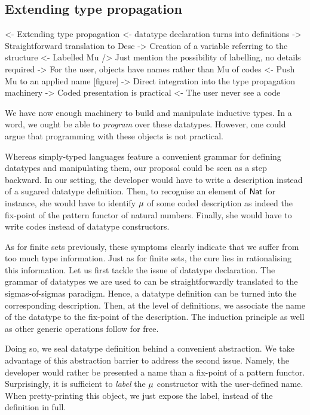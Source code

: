 \subsection{Extending type propagation}

\begin{wstructure}
<- Extending type propagation
    <- datatype declaration turns into definitions
        -> Straightforward translation to Desc
        -> Creation of a variable referring to the structure
    <- Labelled Mu
        /> Just mention the possibility of labelling, no details required
        -> For the user, objects have names rather than Mu of codes
    <- Push Mu to an applied name [figure]
        -> Direct integration into the type propagation machinery
    -> Coded presentation is practical
        <- The user never see a code
\end{wstructure}


We have now enough machinery to build and manipulate inductive
types. In a word, we ought be able to \emph{program} over these
datatypes.  However, one could argue that programming with these
objects is not practical.

Whereas simply-typed languages feature a convenient grammar for
defining datatypes and manipulating them, our proposal could be seen
as a step backward. In our setting, the developer would have to write
a description instead of a sugared datatype definition. Then, to
recognise an element of $\Nat$ for instance, she would have to
identify $\Mu{}$ of some coded description as indeed the fix-point of
the pattern functor of natural numbers. Finally, she would have to
write codes instead of datatype constructors.

As for finite sets previously, these symptoms clearly indicate that we
suffer from too much type information. Just as for finite sets, the
cure lies in rationalising this information. Let us first tackle the
issue of datatype declaration. The grammar of datatypes we are used
to can be straightforwardly translated to the sigmas-of-sigmas
paradigm. Hence, a datatype definition can be turned into the
corresponding description. Then, at the level of definitions, we
associate the name of the datatype to the fix-point of the
description. The induction principle as well as other generic
operations follow for free.

Doing so, we seal datatype definition behind a convenient
abstraction. We take advantage of this abstraction barrier to address
the second issue. Namely, the developer would rather be presented a
name than a fix-point of a pattern functor. Surprisingly, it is
sufficient to \emph{label} the $\Mu{}$ constructor with the
user-defined name. When pretty-printing this object, we just expose
the label, instead of the definition in full.

